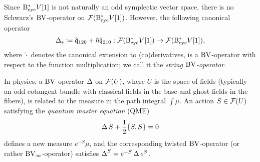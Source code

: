 \documentclass[\MainFolder/Text.tex]{subfiles}
\begin{document}
Since $\mathrm{B}_{\mathrm{cyc}}^* V [1]$ is not naturally an odd symplectic vector space, there is no Schwarz's $\mathrm{BV}$-operator on $\mathcal{F}(\mathrm{B}_{\mathrm{cyc}}^* V [1])$. However, the following canonical operator
\[ \operatorname{\Delta}_{\mathrm{s}} \coloneqq  \hat{\mathfrak{q}}_{120} + \hbar \hat{\mathfrak{q}}_{210}: \mathcal{F}(\mathrm{B}_{\mathrm{cyc}}^* V [1]) \rightarrow \mathcal{F}(\mathrm{B}_{\mathrm{cyc}}^* V [1]), \]
where $\hat{\cdot}$ denotes the canonical extension to (co)derivatives, is a $\mathrm{BV}$-operator with respect to the function multiplication; we call it the \emph{string $\mathrm{BV}$-operator.}

In physics, a $\mathrm{BV}$-operator $\operatorname{\Delta}$ on $\mathcal{F}(U)$, where $U$ is the space of fields (typically an odd cotangent bundle with classical fields in the base and ghost fields in the fibers), is related to the measure in the path integral $\int \mu$.
An action $S\in \mathcal{F}(U)$ satisfying the \emph{quantum master equation} (QME)
\[ \operatorname{\Delta} S + \frac{1}{2}\{S,S\} = 0 \]
defines a new measure $e^{-S} \mu$, and the corresponding twisted $\mathrm{BV}$-operator (or rather $\mathrm{BV}_\infty$-operator) satisfies $\operatorname{\Delta}^S = e^{-S} \operatorname{\Delta} e^{S}$.
\end{document}
